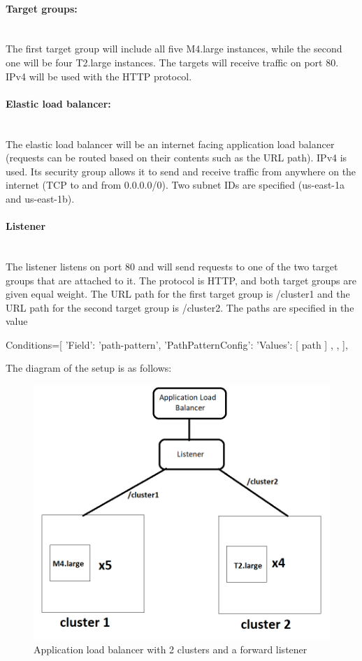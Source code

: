 \documentclass[11pt]{article}
\begin{document}
\paragraph{Target groups:}\mbox{}\\
The first target group will include all five M4.large instances, while the second one will be four T2.large instances. The targets will receive traffic on port 80. IPv4 will be used with the HTTP protocol.

\paragraph{Elastic load balancer:}\mbox{}\\
The elastic load balancer will be an internet facing application load balancer (requests can be routed based on their contents such as the URL path). IPv4 is used. Its security group allows it to send and receive traffic from anywhere on the internet (TCP to and from 0.0.0.0/0). Two subnet IDs are specified (us-east-1a and us-east-1b).

\paragraph{Listener}\mbox{}\\
The listener listens on port 80 and will send requests to one of the two target groups that are attached to it. The protocol is HTTP, and both target groups are given equal weight. The URL path for the first target group is /cluster1 and the URL path for the second target group is /cluster2. The paths are specified in the value

\begin{python}
    Conditions=[
        {
            'Field': 'path-pattern',
            'PathPatternConfig': {
                'Values': [
                    path
                ]
            },
        },
    ],
\end{python}
The diagram of the setup is as follows:

\begin{figure}
    \includegraphics[width=\linewidth]{cluster.png}
    \caption{Application load balancer with 2 clusters and a forward listener}
    \label{fig:setup}
\end{figure}
\end{document}
